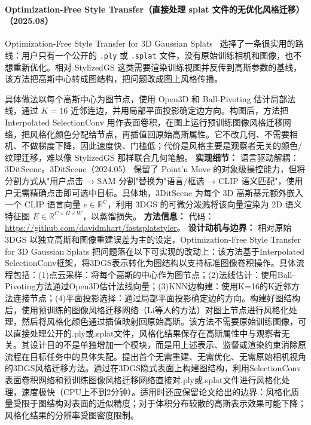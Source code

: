 \paragraph{Optimization-Free Style Transfer（直接处理 splat 文件的无优化风格迁移）（2025.08）}
Optimization-Free Style Transfer for 3D Gaussian Splats~\cite{2508_05813} 选择了一条很实用的路线：用户只有一个公开的 \texttt{.ply} 或 \texttt{.splat} 文件，没有原始训练相机和图像，也不想重新优化。相对 StylizedGS 这类需要渲染训练视图并反传到高斯参数的基线，该方法把高斯中心转成图结构，把问题改成图上风格传播。

具体做法以每个高斯中心为图节点，使用 Open3D 和 Ball-Pivoting 估计局部法线，通过 $K=16$ 近邻连边，并用局部平面投影确定边方向。构图后，方法把 Interpolated SelectionConv 用作表面卷积，在图上运行预训练图像风格迁移网络，把风格化颜色分配给节点，再插值回原始高斯属性。它不改几何、不需要相机、不做梯度下降，因此速度快、门槛低；代价是风格主要是观察者无关的颜色/纹理迁移，难以像 StylizedGS 那样联合几何笔触。
\textbf{实现细节：} 语言驱动解耦：3DitScene。3DitScene（2024.05） 保留了 Point'n Move 的对象级操控能力，但将分割方式从"用户点击 → SAM 分割"替换为"语言/框选 → CLIP 语义匹配"，使用户无需精确点击即可选中目标。具体地，3DitScene 为每个 3D 高斯基元额外嵌入一个 CLIP 语言向量 $e \in \mathbb{R}^C$，利用 3DGS 的可微分泼溅将该向量渲染为 2D 语义特征图 $E \in \mathbb{R}^{C \times H \times W}$，以蒸馏损失。
\textbf{方法信息：} 代码：\url{https://github.com/davidmhart/fastsplatstyler}。
\textbf{设计动机与边界：} 相对原始 3DGS 以独立高斯和图像重建误差为主的设定，Optimization-Free Style Transfer for 3D Gaussian Splats 把问题落在以下可实现的改动上：该方法基于Interpolated SelectionConv框架，将3DGS表示转化为图结构以支持标准图像卷积操作。具体流程包括：(1)点云采样：将每个高斯的中心作为图节点；(2)法线估计：使用Ball-Pivoting方法通过Open3D估计法线向量；(3)KNN边构建：使用K=16的K近邻方法连接节点；(4)平面投影选择：通过局部平面投影确定边的方向。构建好图结构后，使用预训练的图像风格迁移网络（Li等人的方法）对图上节点进行风格化处理，然后将风格化颜色通过插值映射回原始高斯。该方法不需要原始训练图像，可以直接处理公开的.ply或.splat文件，风格化结果保存在高斯属性中与观察者无关。其设计目的不是单独增加一个模块，而是用上述表示、监督或渲染约束消除原流程在目标任务中的具体失配。提出首个无需重建、无需优化、无需原始相机视角的3DGS风格迁移方法。通过在3DGS隐式表面上构建图结构，利用SelectionConv表面卷积网络和预训练图像风格迁移网络直接对.ply或.splat文件进行风格化处理，速度极快（CPU上不到2分钟）。适用时还应保留论文给出的边界：风格化质量受限于图结构对表面的近似精度；对于体积分布较散的高斯表示效果可能下降；风格化结果的分辨率受图密度限制。
